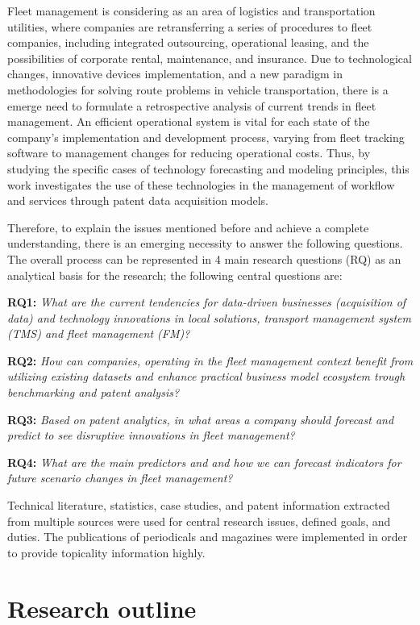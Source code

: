 \documentclass[12pt,twoside]{reedthesis}
\begin{document}
Fleet management is considering as an area of logistics and transportation utilities, where companies are retransferring a series of procedures to fleet companies, including integrated outsourcing, operational leasing, and the possibilities of corporate rental, maintenance, and insurance. Due to technological changes, innovative devices implementation, and a new paradigm in methodologies for solving route problems in vehicle transportation, there is a emerge need to formulate a retrospective analysis of current trends in fleet management. An efficient operational system is vital for each state of the company's implementation and development process, varying from fleet tracking software to management changes for reducing operational costs. Thus, by studying the specific cases of technology forecasting and modeling principles, this work investigates the use of these technologies in the management of workflow and services through patent data acquisition models.

Therefore, to explain the issues mentioned before and achieve a complete understanding, there is an emerging necessity to answer the following questions. The overall process can be represented in 4 main research questions (RQ) as an analytical basis for the research; the following central questions are:

\textbf{RQ1:}
\emph{What are the current tendencies for data-driven businesses (acquisition of data) and technology innovations in local solutions, transport management system (TMS) and fleet management (FM)?}

\textbf{RQ2:}
\emph{How can companies, operating in the fleet management context benefit from utilizing existing datasets and enhance practical business model ecosystem trough benchmarking and patent analysis?}

\textbf{RQ3:}
\emph{Based on patent analytics, in what areas a company should forecast and predict to see disruptive innovations in fleet management?}

\textbf{RQ4:}
\emph{What are the main predictors and and how we can forecast indicators for future scenario changes in fleet management?}

Technical literature, statistics, case studies, and patent information extracted from multiple sources were used for central research issues, defined goals, and duties. The publications of periodicals and magazines were implemented in order to provide topicality information highly.

\hypertarget{research-outline}{%
\section*{Research outline}\label{research-outline}}
\end{document}
